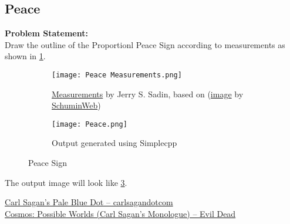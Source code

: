 \documentclass[../../Problems]{subfiles}
\begin{document}
\subsection{Peace}{\label{pp:peace}}
\textbf{Problem Statement:}\\
Draw the outline of the Proportionl Peace Sign according to measurements as shown in \ref{fig:peacemeasurements}.
\begin{figure}[H]
\centering
	\begin{subfigure}{\linewidth}
	\centering
	\texttt{[image: Peace Measurements.png]}
	\caption{\href{https://bit.ly/peace-sign-measurements}{Measurements} by Jerry S. Sadin, based on (\href{https://bit.ly/peace-sign-wikipedia}{image} by \href{https://commons.wikimedia.org/wiki/User:SchuminWeb}{SchuminWeb})}
	\label{fig:peacemeasurements}
\end{subfigure}
\begin{subfigure}{\linewidth}
	\centering
	\texttt{[image: Peace.png]}
	\caption{Output generated using Simplecpp}
	\label{fig:peace}
\end{subfigure}
\caption{Peace Sign}
\end{figure}
The output image will look like \ref{fig:peace}.
\begin{funvideo}
\href{https://youtu.be/GO5FwsblpT8}{Carl Sagan's Pale Blue Dot -- carlsagandotcom}\\
\href{https://youtu.be/lshWT0iyxds}{Cosmos: Possible Worlds (Carl Sagan's Monologue) -- Evil Dead}
\end{funvideo}
\end{document}
